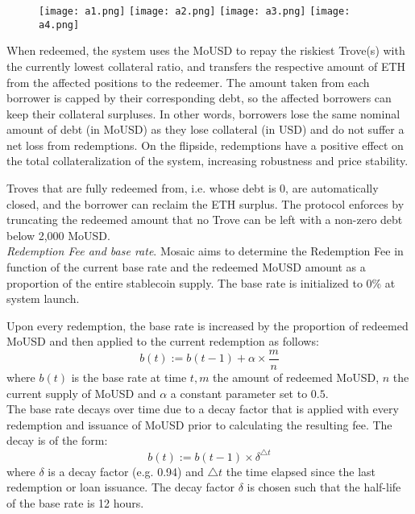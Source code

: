 \documentclass{article}
\begin{document}
\begin{figure}[h]
\centering
\texttt{[image: a1.png]}
\texttt{[image: a2.png]}
\texttt{[image: a3.png]}
\texttt{[image: a4.png]}
\end{figure}

When redeemed, the system uses the MoUSD to repay the riskiest Trove(s) with the currently lowest collateral ratio, and transfers the respective amount of ETH from the affected positions to the redeemer. The amount taken from each borrower is capped by their corresponding debt, so the affected borrowers can keep their collateral surpluses. In other words, borrowers lose the same nominal amount of debt (in MoUSD) as they lose collateral (in USD) and do not suffer a net loss from redemptions. On the flipside, redemptions have a positive effect on the total collateralization of the system, increasing robustness and price stability.

Troves that are fully redeemed from, i.e. whose debt is 0, are automatically closed, and the borrower can reclaim the ETH surplus. The protocol enforces by truncating the redeemed amount that no Trove can be left with a non-zero debt below 2,000 MoUSD. \\

\textit{Redemption Fee and base rate}. Mosaic aims to determine the Redemption Fee in function of the current base rate and the redeemed MoUSD amount as a proportion of the entire stablecoin supply. The base rate is initialized to 0\% at system launch.

Upon every redemption, the base rate is increased by the proportion of redeemed MoUSD and then applied to the current redemption as follows:
$$b(t):=b(t-1)+\alpha\times\frac{m}{n}$$
where $b(t)$ is the base rate at time $t,m$ the amount of redeemed MoUSD, $n$ the current supply of MoUSD and $\alpha$ a constant parameter set to $0.5$.\\

The base rate decays over time due to a decay factor that is applied with every redemption and issuance of MoUSD prior to calculating the resulting fee. The decay is of the form:
$$b(t):=b(t-1)\times\delta^{\triangle t}$$
where $\delta$ is a decay factor (e.g. 0.94) and $\triangle t$ the time elapsed since the last redemption or loan issuance. The decay factor $\delta$ is chosen such that the half-life of the base rate is 12 hours. \\
\end{document}
